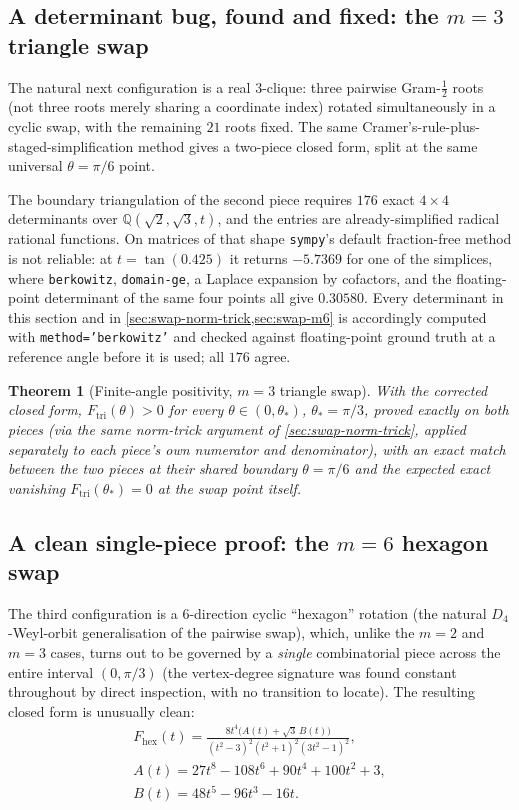 \documentclass[11pt,reqno]{amsart}
\renewcommand{\_}{\origunderscore\allowbreak}
\numberwithin{equation}{section}
\theoremstyle{plain}
\newtheorem{thm}{Theorem}[section]
\theoremstyle{definition}
\theoremstyle{remark}
\begin{document}
\subsection{A determinant bug, found and fixed: the \texorpdfstring{$m=3$}{m=3} triangle swap}\label{sec:swap-m3}

The natural next configuration is a real $3$-clique: three pairwise
Gram-$\tfrac12$ roots (not three roots merely sharing a coordinate
index) rotated simultaneously in a cyclic swap, with the remaining
$21$ roots fixed. The same Cramer's-rule-plus-staged-simplification
method gives a two-piece closed form, split at the same universal
$\theta=\pi/6$ point.

The boundary triangulation of the second piece requires $176$ exact
$4\times4$ determinants over $\mathbb{Q}(\sqrt2,\sqrt3,t)$, and the
entries are already-simplified radical rational functions. On matrices
of that shape \texttt{sympy}'s default fraction-free method is not
reliable: at $t=\tan(0.425)$ it returns $-5.7369$ for one of the
simplices, where \texttt{berkowitz}, \texttt{domain-ge}, a Laplace
expansion by cofactors, and the floating-point determinant of the same
four points all give $0.30580$. Every determinant in this section and
in \cref{sec:swap-norm-trick,sec:swap-m6} is accordingly computed with
\texttt{method='berkowitz'} and checked against floating-point ground
truth at a reference angle before it is used; all $176$ agree.

\begin{thm}[Finite-angle positivity, $m=3$ triangle swap]\label{thm:swap-m3-new}
With the corrected closed form, $F_{\mathrm{tri}}(\theta)>0$ for every
$\theta\in(0,\theta_*)$, $\theta_*=\pi/3$, proved exactly on both
pieces (via the same norm-trick argument of \cref{sec:swap-norm-trick},
applied separately to each piece's own numerator and denominator), with
an exact match between the two pieces at their shared boundary
$\theta=\pi/6$ and the expected exact vanishing $F_{\mathrm{tri}}(\theta_*)=0$
at the swap point itself.
\end{thm}

\subsection{A clean single-piece proof: the \texorpdfstring{$m=6$}{m=6} hexagon swap}\label{sec:swap-m6}

The third configuration is a $6$-direction cyclic ``hexagon'' rotation
(the natural $D_4$-Weyl-orbit generalisation of the pairwise swap),
which, unlike the $m=2$ and $m=3$ cases, turns out to be governed
by a \emph{single} combinatorial piece across the entire interval
$(0,\pi/3)$ (the vertex-degree signature was found constant throughout
by direct inspection, with no transition to locate). The resulting
closed form is unusually clean:
\[
\begin{gathered}
  F_{\mathrm{hex}}(t) = \frac{8t^4\bigl(A(t)+\sqrt3\,B(t)\bigr)}
  {(t^2-3)^2(t^2+1)^2(3t^2-1)^2},\\
  A(t)=27t^8-108t^6+90t^4+100t^2+3,\\
  B(t)=48t^5-96t^3-16t.
\end{gathered}
\]
\end{document}
